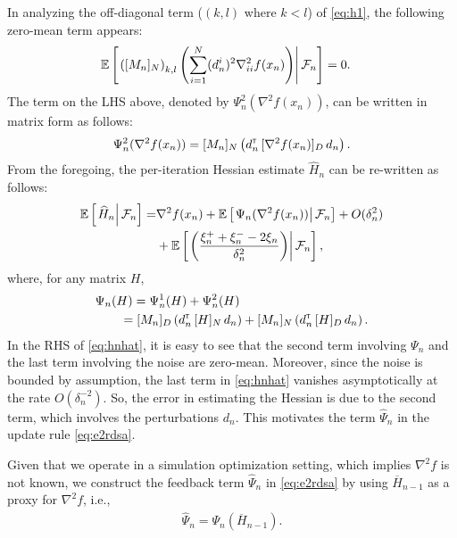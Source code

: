 \documentclass[letterpaper, 10 pt, conference]{ieeeconf}  %
\begin{document}
In analyzing the off-diagonal term ($(k,l)$ where $k < l$) of \eqref{eq:h1}, the following zero-mean term appears:
\begin{align}
& \mathbb{E}\left[\left.\left([M_n]_{N}\right)_{k,l}   \left(\sum\limits_{i=1}^N (d_n^i)^2 \nabla^2_{ii} f(x_n)\right)\right| \mathcal{F}_n \right] = 0. 
\end{align}
The term on the LHS above, denoted by $\Psi_{n}^{2}(\nabla^2 f(x_n))$, can be written in matrix form as follows: 
\begin{align}\label{eq:ndmat}
\Psi_{n}^{2}(\nabla^2 f(x_n)) = [M_n]_{N}\left(d_{n}^\mathsf{\scriptscriptstyle T} \, [\nabla^2 f(x_n)]_{D} \, d_{n}\right).
\end{align}
From the foregoing, the per-iteration Hessian estimate $\widehat H_n$ can be re-written as follows:
\begin{align}
 \mathbb{E}\left[\left.\widehat H_n\right| \mathcal{F}_n\right] = & \nabla^2 f(x_n) + \mathbb{E}\left[\left.\Psi_{n}(\nabla^2 f(x_n))\right| \mathcal{F}_n\right]  +  O(\delta_n^2)\nonumber\\
&+\mathbb{E}\left[\left.\left(\dfrac{\xi_n^+ + \xi_n^- - 2 \xi_n}{\delta_n^2} \right)\right| \mathcal{F}_n\right], \label{eq:hnhat}
\end{align}
where, for any matrix $H$, 
\begin{align}
&\Psi_{n}(H) = \Psi_{n}^{1}(H) + \Psi_{n}^{2}(H)\nonumber\\
&\qquad= [M_n]_{D}\left(d_{n}^\mathsf{\scriptscriptstyle T} \, [H]_{N} \, d_{n}\right) +  [M_n]_{N}\left(d_{n}^\mathsf{\scriptscriptstyle T} \, [H]_{D} \, d_{n}\right).\label{eq:psi}
\end{align}
In the RHS of \eqref{eq:hnhat}, it is easy to see that  the second term involving $\Psi_{n}$ and the last term involving the noise are zero-mean. Moreover, since the noise is bounded by assumption, the last term in \eqref{eq:hnhat} vanishes asymptotically at the rate $O(\delta_n^{-2})$. So, the error in estimating the Hessian is due to the second term, which involves the perturbations $d_n$. This motivates the term $\widehat \Psi_n$ in the update rule \eqref{eq:e2rdsa}. 


Given that we operate in a simulation optimization setting, which implies $\nabla^2 f$ is not known, we construct the feedback term $\widehat \Psi_n$ in \eqref{eq:e2rdsa} by using $\overline H_{n-1}$ as a proxy for $\nabla^2 f$, i.e.,
\begin{align}
\widehat \Psi_n = \Psi_{n} (\overline H_{n-1}).
\label{eq:psinhat}
\end{align}
\end{document}
